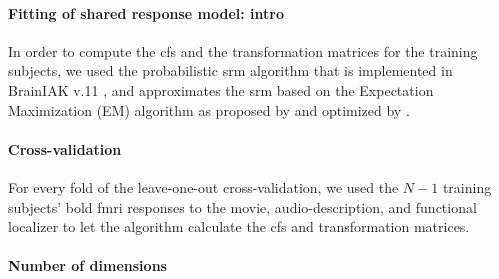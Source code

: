 \paragraph{Fitting of shared response model: intro}



In order to compute the \ac{cfs} and the transformation matrices for the
training subjects, we used the probabilistic \ac{srm} algorithm that is
implemented in BrainIAK v.11 \citep[Brain Imaging Analysis
Kit;][]{kumar2020brainiak, kumar2020brainiaktutorial}, and approximates the
\ac{srm} based on the Expectation Maximization (EM) algorithm as proposed by
\citet{chen2015reduced} and optimized by \citet{anderson2016enabling}.

\paragraph{Cross-validation}
%
For every fold of the leave-one-out cross-validation, we used the $N-1$ training
subjects' \ac{bold} \ac{fmri} responses to the movie, audio-description, and
functional localizer to let the algorithm calculate the \ac{cfs} and
transformation matrices.


\paragraph{Number of dimensions}

%
%

